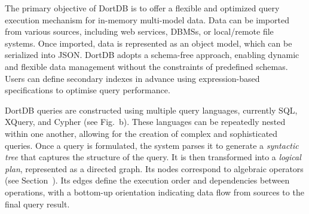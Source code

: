 The primary objective of DortDB is to offer a flexible and optimized query execution mechanism for in-memory multi-model data. %
%
Data can be imported from various sources, including web services, DBMSs, or local/remote file systems. %
Once imported, data is represented as an object model, which can be serialized into JSON. DortDB adopts a schema-free approach, enabling dynamic and flexible data management without the constraints of predefined schemas. Users can define secondary indexes in advance using expression-based specifications to optimise query performance.





DortDB queries are constructed using multiple query languages, currently SQL, XQuery, and Cypher (see Fig.~b). These languages can be repeatedly nested within one another, allowing for the creation of complex and sophisticated queries. 
Once a query is formulated, the system parses it to generate a \textit{syntactic tree} that captures the structure of the query. It is then transformed into a \textit{logical plan}, represented as a directed graph. Its nodes correspond to algebraic operators (see Section~). Its edges define the execution order and dependencies between operations, with a bottom-up orientation indicating data flow from sources to the final query result.

